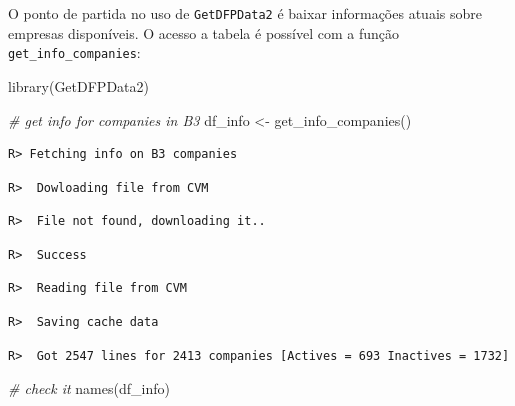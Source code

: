 \documentclass[
  11pt,
]{book}
\newenvironment{Shaded}{\begin{snugshade}}{\end{snugshade}}
\newcommand{\CommentTok}[1]{\textcolor[rgb]{0.37,0.37,0.37}{\textit{#1}}}
\newcommand{\FunctionTok}[1]{\textcolor[rgb]{0,0,0}{#1}}
\newcommand{\NormalTok}[1]{#1}
\newcommand{\OtherTok}[1]{\textcolor[rgb]{0.37,0.37,0.37}{#1}}
\begin{document}
O ponto de partida no uso de \texttt{GetDFPData2} é baixar informações atuais sobre empresas disponíveis. O acesso a tabela é possível com a função \texttt{get\_info\_companies}:  

\begin{Shaded}
\begin{Highlighting}[]
\FunctionTok{library}\NormalTok{(GetDFPData2)}

\CommentTok{\# get info for companies in B3}
\NormalTok{df\_info }\OtherTok{\textless{}{-}} \FunctionTok{get\_info\_companies}\NormalTok{()}
\end{Highlighting}
\end{Shaded}

\begin{verbatim}
R> Fetching info on B3 companies
\end{verbatim}

\begin{verbatim}
R>  Dowloading file from CVM
\end{verbatim}

\begin{verbatim}
R>  File not found, downloading it..
\end{verbatim}

\begin{verbatim}
R>  Success
\end{verbatim}

\begin{verbatim}
R>  Reading file from CVM
\end{verbatim}

\begin{verbatim}
R>  Saving cache data
\end{verbatim}

\begin{verbatim}
R>  Got 2547 lines for 2413 companies [Actives = 693 Inactives = 1732]
\end{verbatim}

\begin{Shaded}
\begin{Highlighting}[]
\CommentTok{\# check it}
\FunctionTok{names}\NormalTok{(df\_info)}
\end{Highlighting}
\end{Shaded}
\end{document}
